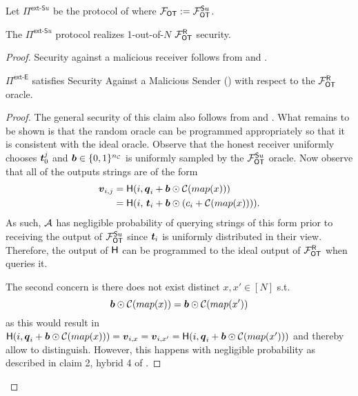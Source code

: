 \begin{definition}\label{def:ext_Su_R}
	Let $\Pi^{\textsf{ext-S}u}$ be the protocol of  where $\OOT:=\OOT^{\send u}$.
\end{definition}
\begin{lemma}\label{lem:ext_Su_R}
	The $\Pi^{\textsf{ext-S}u}$ protocol realizes 1-out-of-$N$ $\OOT^\rec$ security.
\end{lemma}
\begin{proof}
	Security against a malicious receiver follows from  and . 
	
	
	\begin{claim}\label{claim:ext-Su-MalSender}
		$\Pi^\textsf{ext-E}$ satisfies Security Against a Malicious Sender () with respect to the $\OOT^\rec$ oracle.
	\end{claim}
	\begin{proof}
		The general security of this claim also follows from  and . What remains to be shown is that the random oracle can be programmed appropriately so that it is consistent with the ideal oracle. Observe that the honest receiver uniformly chooses $\tt_0^j$ and $\bb\in\{0,1\}^\nc$ is uniformly sampled by the $\OOT^{\send u}$ oracle. Now observe that all of the outputs strings are of the form
		\begin{align*}
			\vv_{i,j}&=\H(i,\qq_i + \bb \odot \mathcal{C}(map(x)))\\
					 &=\H(i,\, \tt_i + \bb \odot (c_i + \mathcal{C}(map(x)))).
		\end{align*}
		As such, $\Adv$ has negligible probability of querying strings of this form prior to receiving the output of $\OOT^{\send u}$ since $\tt_i$ is uniformly distributed in their view. Therefore, the output of $\H$ can be programmed to the ideal output of $\OOT^\rec$ when \Adv queries it.
		
		The second concern is there does not exist distinct $x,x'\in[N]$ s.t. 
		$$
			\bb \odot \mathcal{C}(map(x)) = \bb \odot \mathcal{C}(map(x'))
		$$
		as this would result in $\H(i,\qq_i + \bb \odot \mathcal{C}(map(x)))=\vv_{i,x}=\vv_{i,x'}=\H(i,\qq_i + \bb \odot \mathcal{C}(map(x')))$ and thereby allow \Adv to distinguish. However, this happens with negligible probability as described in claim 2, hybrid 4 of  .
	\end{proof}
\end{proof}




